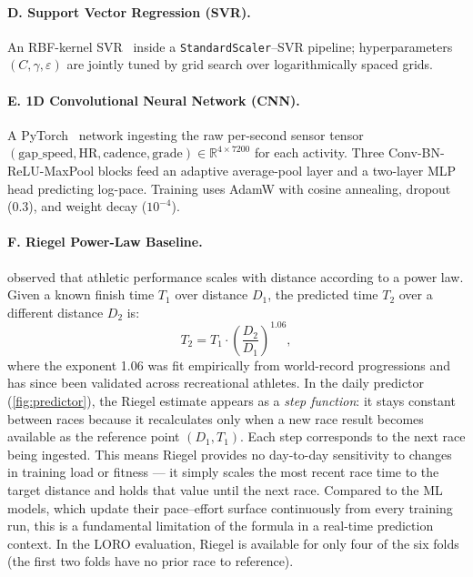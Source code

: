 \documentclass[11pt, a4paper]{article}
\begin{document}
\paragraph{D. Support Vector Regression (SVR).}
An RBF-kernel SVR~\citep{Vapnik1995} inside a \texttt{StandardScaler}--SVR
pipeline; hyperparameters $(C, \gamma, \varepsilon)$ are jointly tuned by
grid search over logarithmically spaced grids.

\paragraph{E. 1D Convolutional Neural Network (CNN).}
A PyTorch~\citep{PyTorch2019} network ingesting the raw per-second sensor
tensor $(\mathrm{gap\_speed}, \mathrm{HR}, \mathrm{cadence},
\mathrm{grade}) \in \mathbb{R}^{4 \times 7200}$ for each activity.
Three Conv-BN-ReLU-MaxPool blocks feed an adaptive average-pool layer and
a two-layer MLP head predicting log-pace.
Training uses AdamW with cosine annealing, dropout (0.3), and
weight decay ($10^{-4}$).

\paragraph{F. Riegel Power-Law Baseline.}
\citet{Riegel1981} observed that athletic performance scales with distance
according to a power law.
Given a known finish time $T_1$ over distance $D_1$, the predicted time
$T_2$ over a different distance $D_2$ is:
\begin{equation}
  T_2 = T_1 \cdot \left(\frac{D_2}{D_1}\right)^{1.06},
  \label{eq:riegel}
\end{equation}
where the exponent 1.06 was fit empirically from world-record progressions
and has since been validated across recreational athletes.
In the daily predictor (\cref{fig:predictor}), the Riegel estimate appears as
a \emph{step function}: it stays constant between races because it
recalculates only when a new race result becomes available as the reference
point $(D_1, T_1)$.
Each step corresponds to the next race being ingested.
This means Riegel provides no day-to-day sensitivity to changes in training
load or fitness --- it simply scales the most recent race time to the target
distance and holds that value until the next race.
Compared to the ML models, which update their pace--effort surface
continuously from every training run, this is a fundamental limitation of
the formula in a real-time prediction context.
In the LORO evaluation, Riegel is available for only four of the six folds
(the first two folds have no prior race to reference).
\end{document}
